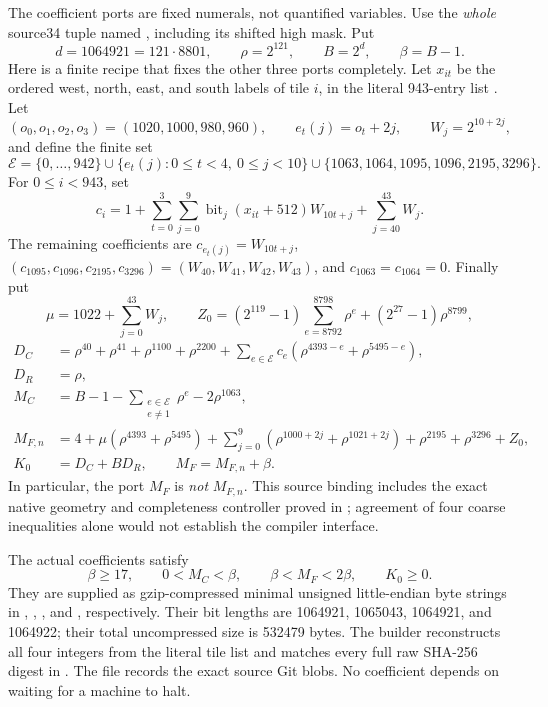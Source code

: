 The coefficient ports are fixed numerals, not quantified variables.  Use
the \emph{whole} source34 tuple named
, including its shifted high mask.
Put
\[
 d=1064921=121\cdot8801,\qquad
 \rho=2^{121},\qquad B=2^d,\qquad \beta=B-1.
\]
Here is a finite recipe that fixes the other three ports completely.  Let
\(x_{it}\) be the ordered west, north, east, and south labels of tile
\(i\), in the literal 943-entry list
.  Let
\[
 (o_0,o_1,o_2,o_3)=(1020,1000,980,960),\qquad
 e_t(j)=o_t+2j,\qquad W_j=2^{10+2j},
\]
and define the finite set
\[
 \mathcal E=\{0,\ldots,942\}
 \cup\{e_t(j):0\leq t<4,\ 0\leq j<10\}
 \cup\{1063,1064,1095,1096,2195,3296\}.
\]
For \(0\leq i<943\), set
\[
 c_i=1+\sum_{t=0}^3\sum_{j=0}^9
       \operatorname{bit}_j(x_{it}+512)W_{10t+j}
       +\sum_{j=40}^{43}W_j.
\]
The remaining coefficients are
\(c_{e_t(j)}=W_{10t+j}\),
\((c_{1095},c_{1096},c_{2195},c_{3296})=(W_{40},W_{41},W_{42},W_{43})\),
and \(c_{1063}=c_{1064}=0\).  Finally put
\[
 \mu=1022+\sum_{j=0}^{43}W_j,\qquad
 Z_0=(2^{119}-1)\sum_{e=8792}^{8798}\rho^e
       +(2^{27}-1)\rho^{8799},
\]
\begin{align*}
 D_C&=\rho^{40}+\rho^{41}+\rho^{1100}+\rho^{2200}
       +\sum_{e\in\mathcal E}c_e
            (\rho^{4393-e}+\rho^{5495-e}),\\
 D_R&=\rho,\\
 M_C&=B-1-\sum_{\substack{e\in\mathcal E\\e\ne1}}\rho^e
             -2\rho^{1063},\\
 M_{F,n}&=4+\mu(\rho^{4393}+\rho^{5495})
       +\sum_{j=0}^9(\rho^{1000+2j}+\rho^{1021+2j})
       +\rho^{2195}+\rho^{3296}+Z_0,\\
 K_0&=D_C+BD_R,\qquad M_F=M_{F,n}+\beta.
\end{align*}
In particular, the port \(M_F\) is \emph{not} \(M_{F,n}\).  This source
binding includes the exact native geometry and completeness controller
proved in ; agreement of four coarse
inequalities alone would not establish the compiler interface.

The actual coefficients satisfy
\[
 \beta\geq17,\qquad 0<M_C<\beta,
 \qquad \beta<M_F<2\beta,\qquad K_0\geq0.
\]
They are supplied as gzip-compressed minimal unsigned little-endian byte
strings in , ,
, and
, respectively.  Their bit lengths are
1064921, 1065043, 1064921, and 1064922; their total uncompressed size is
532479 bytes.  The builder reconstructs all four integers from the literal
tile list and matches every full raw SHA-256 digest in
.  The file
 records the exact source Git blobs.  No coefficient
depends on waiting for a machine to halt.


